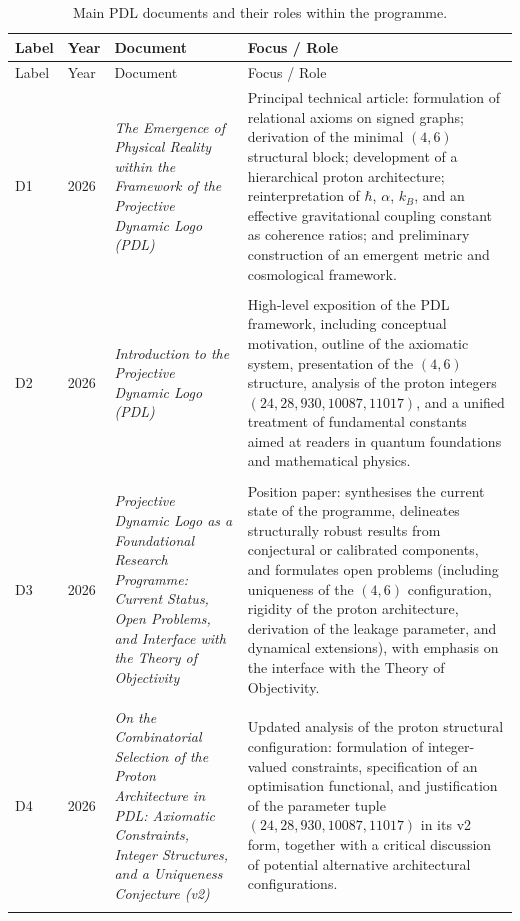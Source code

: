 \documentclass[11pt,a4paper]{article}
\begin{document}
\setlength{\LTpre}{18pt}
\setlength{\LTpost}{0pt}

\begin{longtable}{@{}llL{4cm}p{9.5cm}@{}}
\caption{Main PDL documents and their roles within the programme.}
\label{tab:documents}\\
\toprule
Label & Year & Document & Focus / Role \\
\midrule
\endfirsthead

\toprule
Label & Year & Document & Focus / Role \\
\midrule
\endhead

D1 & 2026 & \textit{The Emergence of Physical Reality within the Framework of the Projective Dynamic Logo (PDL)} &
Principal technical article: formulation of relational axioms on signed graphs; derivation of the minimal $(4,6)$ structural block; development of a hierarchical proton architecture; reinterpretation of $\hbar$, $\alpha$, $k_B$, and an effective gravitational coupling constant as coherence ratios; and preliminary construction of an emergent metric and cosmological framework. \citep{PDL_Main_2026} \\\\[0.5em]

D2 & 2026 & \textit{Introduction to the Projective Dynamic Logo (PDL)} &
High-level exposition of the PDL framework, including conceptual motivation, outline of the axiomatic system, presentation of the $(4,6)$ structure, analysis of the proton integers $(24,28,930,10087,11017)$, and a unified treatment of fundamental constants aimed at readers in quantum foundations and mathematical physics. \citep{PDL_intro} \\\\[0.5em]

D3 & 2026 & \textit{Projective Dynamic Logo as a Foundational Research Programme: Current Status, Open Problems, and Interface with the Theory of Objectivity} &
Position paper: synthesises the current state of the programme, delineates structurally robust results from conjectural or calibrated components, and formulates open problems (including uniqueness of the $(4,6)$ configuration, rigidity of the proton architecture, derivation of the leakage parameter, and dynamical extensions), with emphasis on the interface with the Theory of Objectivity. \citep{PDL_position,PDL_TO_dialogue} \\\\[0.5em]

D4 & 2026 & \textit{On the Combinatorial Selection of the Proton Architecture in PDL: Axiomatic Constraints, Integer Structures, and a Uniqueness Conjecture (v2)} &
Updated analysis of the proton structural configuration: formulation of integer-valued constraints, specification of an optimisation functional, and justification of the parameter tuple $(24,28,930,10087,11017)$ in its v2 form, together with a critical discussion of potential alternative architectural configurations. \citep{Combinatorial_Proton_v2_2026} \\\\[0.5em]


\end{longtable}
\end{document}
